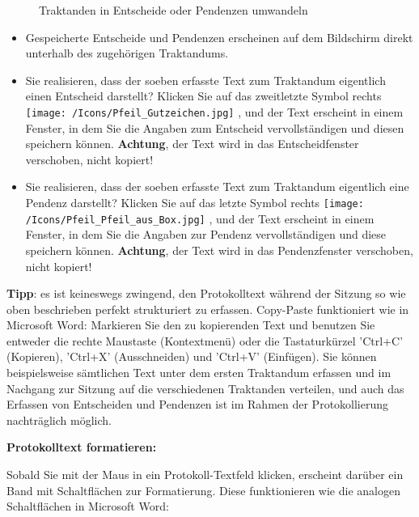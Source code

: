 \begin{figure}[H]
\caption{Traktanden in Entscheide oder Pendenzen umwandeln}
\end{figure}

\begin{itemize}
\item
Gespeicherte Entscheide und Pendenzen erscheinen auf dem Bildschirm direkt unterhalb des zugehörigen Traktandums.
\item
Sie realisieren, dass der soeben erfasste Text zum Traktandum eigentlich einen Entscheid darstellt? Klicken Sie auf das zweitletzte Symbol rechts \texttt{[image: /Icons/Pfeil\_Gutzeichen.jpg]} , und der Text erscheint in einem Fenster, in dem Sie die Angaben zum Entscheid vervollständigen und diesen speichern können. \textbf{Achtung}, der Text wird in das Entscheidfenster verschoben, nicht kopiert!
\item
Sie realisieren, dass der soeben erfasste Text zum Traktandum eigentlich eine Pendenz darstellt? Klicken Sie auf das letzte Symbol rechts \texttt{[image: /Icons/Pfeil\_Pfeil\_aus\_Box.jpg]} , und der Text erscheint in einem Fenster, in dem Sie die Angaben zur Pendenz vervollständigen und diese speichern können. \textbf{Achtung}, der Text wird in das Pendenzfenster verschoben, nicht kopiert!
\end{itemize}


\textbf{Tipp}: es ist keineswegs zwingend, den Protokolltext während der Sitzung so wie oben beschrieben perfekt strukturiert zu erfassen. Copy-Paste funktioniert wie in Microsoft Word: Markieren Sie den zu kopierenden Text und benutzen Sie entweder die rechte Maustaste (Kontextmenü) oder die Tastaturkürzel 'Ctrl+C' (Kopieren), 'Ctrl+X' (Ausschneiden) und 'Ctrl+V' (Einfügen). Sie können beispielsweise sämtlichen Text unter dem ersten Traktandum erfassen und im Nachgang zur Sitzung auf die verschiedenen Traktanden verteilen, und auch das Erfassen von Entscheiden und Pendenzen ist im Rahmen der Protokollierung nachträglich möglich.

\vspace{\baselineskip}

\textbf{Protokolltext formatieren:}


Sobald Sie mit der Maus in ein Protokoll-Textfeld klicken, erscheint darüber ein Band mit Schaltflächen  zur Formatierung. Diese funktionieren wie die analogen Schaltflächen in Microsoft Word:

